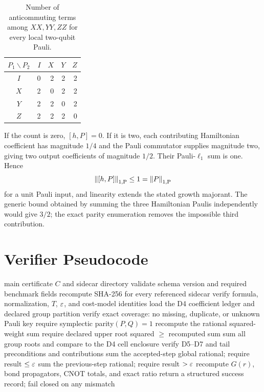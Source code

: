 \begin{table}[ht]
\centering
\caption{Number of anticommuting terms among $XX,YY,ZZ$ for every local
two-qubit Pauli.}
\label{tab:local-audit}
\begin{tabular}{@{}c|rrrr@{}}
\toprule
$P_1\backslash P_2$ & $I$ & $X$ & $Y$ & $Z$ \\
\midrule
$I$ & 0 & 2 & 2 & 2 \\
$X$ & 2 & 0 & 2 & 2 \\
$Y$ & 2 & 2 & 0 & 2 \\
$Z$ & 2 & 2 & 2 & 0 \\
\bottomrule
\end{tabular}
\end{table}

If the count is zero, $[h,P]=0$.  If it is two, each contributing Hamiltonian
coefficient has magnitude $1/4$ and the Pauli commutator supplies magnitude
two, giving two output coefficients of magnitude $1/2$.  Their
Pauli-$\ell_1$ sum is one.  Hence
\begin{equation}
  \left\lVert [h,P]\right\rVert_{1,\mathrm{P}}\leq1=\left\lVert P\right\rVert_{1,\mathrm{P}}
\end{equation}
for a unit Pauli input, and linearity extends the stated growth majorant.  The
generic bound obtained by summing the three Hamiltonian Paulis independently
would give $3/2$; the exact parity enumeration removes the impossible third
contribution.

\section{Verifier Pseudocode}
\label{app:verifier}

\begin{algorithm}[ht]
\caption{Independent verification of the principal certificate}
\label{alg:verifier}
\begin{algorithmic}[1]
\Require main certificate $C$ and sidecar directory
\State validate schema version and required benchmark fields
\State recompute SHA-256 for every referenced sidecar
\State verify formula, normalization, $T$, $\varepsilon$, and cost-model identities
\State load the D4 coefficient ledger and declared group partition
\State verify exact coverage: no missing, duplicate, or unknown Pauli key
    \State require symplectic parity$(P,Q)=1$
  \EndFor
  \State recompute the rational squared-weight sum
  \State require declared upper root squared $\geq$ recomputed sum
\EndFor
\State sum all group roots and compare to the D4 cell enclosure
\State verify D5--D7 and tail preconditions and contributions
\State sum the accepted-step global rational; require result $\leq\varepsilon$
\State sum the previous-step rational; require result $>\varepsilon$
\State recompute $G(r)$, bond propagators, CNOT totals, and exact ratio
\State return a structured success record; fail closed on any mismatch
\end{algorithmic}
\end{algorithm}

